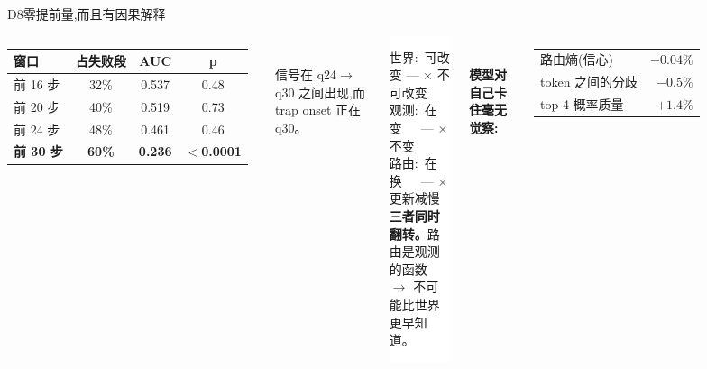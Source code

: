 \documentclass[aspectratio=169,10pt]{beamer}
\newcommand{\bad}[1]{{\color{brick}\bfseries #1}}
\newcommand{\dimm}[1]{{\footnotesize\color{gray2}#1}}
\begin{document}
\begin{frame}{D8\quad 零提前量,而且有因果解释}
  \small
  \begin{columns}[T]
      \begin{tabular}{@{}lccc@{}}
        \toprule
        \textbf{窗口} & \textbf{占失败段} & \textbf{AUC} & \textbf{p} \\ \midrule
        前 16 步 & 32\% & 0.537 & 0.48 \\
        前 20 步 & 40\% & 0.519 & 0.73 \\
        前 24 步 & 48\% & 0.461 & 0.46 \\
        \textbf{前 30 步} & \textbf{60\%} & \bad{0.236} & \bad{$<$0.0001} \\ \bottomrule
      \end{tabular}\\[6pt]
      \dimm{信号在 q24$\rightarrow$q30 之间出现,而 trap onset 正在 q30。}
      \colorbox{white}{\parbox{0.95\linewidth}{\scriptsize\vspace{3pt}
        世界:\ 可改变 --- $\times$ 不可改变\\
        观测:\ 在变\ \ \ --- $\times$ 不变\\
        路由:\ 在换\ \ \ --- $\times$ 更新减慢\\[3pt]
        \bad{三者同时翻转。}路由是观测的函数\\
        $\rightarrow$ 不可能比世界更早知道。\vspace{3pt}}}\\[8pt]
      \textbf{模型对自己卡住毫无觉察:}\\
      \begin{tabular}{@{}lr@{}}
        路由熵(信心) & \bad{$-0.04\%$} \\
        token 之间的分歧 & $-0.5\%$ \\
        top-4 概率质量 & $+1.4\%$ \\
      \end{tabular}
  \end{columns}
\end{frame}
\end{document}
